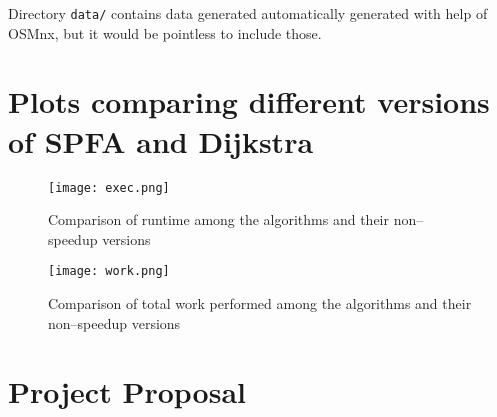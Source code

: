 \documentclass[12pt,a4paper,twoside,openright]{report}
\begin{document}
\noindent Directory \texttt{data/} contains data generated automatically generated with help of OSMnx, but it would be pointless to include those.

\chapter{Plots comparing different versions of SPFA and Dijkstra}
\begin{figure}[h]
\centering \texttt{[image: exec.png]}
\caption{Comparison of runtime among the algorithms and their non--speedup versions}
\end{figure}

\begin{figure}
\centering \texttt{[image: work.png]}
\caption{Comparison of total work performed among the algorithms and their non--speedup versions}
\end{figure}







\chapter{Project Proposal}

%
\end{document}
